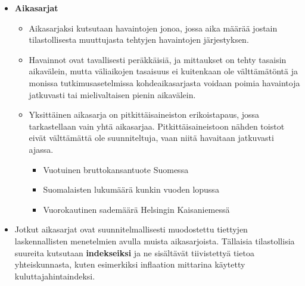 \documentclass[
]{book}
\providecommand{\tightlist}{%
  \setlength{\itemsep}{0pt}\setlength{\parskip}{0pt}}
\begin{document}
\begin{itemize}
\tightlist
\item
  \textbf{Aikasarjat}

  \begin{itemize}
  \tightlist
  \item
    Aikasarjaksi kutsutaan havaintojen jonoa, jossa aika
    määrää jostain tilastollisesta muuttujasta tehtyjen havaintojen järjestyksen.
  \item
    Havainnot ovat tavallisesti peräkkäisiä, ja mittaukset on tehty tasaisin aikavälein, mutta väliaikojen tasaisuus ei kuitenkaan ole välttämätöntä ja monissa tutkimusasetelmissa kohdeaikasarjasta voidaan poimia havaintoja jatkuvasti tai mielivaltaisen pienin aikavälein.
  \item
    Yksittäinen aikasarja on pitkittäisaineiston erikoistapaus, jossa tarkastellaan vain yhtä aikasarjaa. Pitkittäisaineistoon nähden toistot eivät välttämättä ole suunniteltuja, vaan niitä havaitaan jatkuvasti ajassa.

    \begin{itemize}
    \tightlist
    \item
      Vuotuinen bruttokansantuote Suomessa
    \item
      Suomalaisten lukumäärä kunkin vuoden lopussa
    \item
      Vuorokautinen sademäärä Helsingin Kaisaniemessä
    \end{itemize}
  \end{itemize}
\item
  Jotkut aikasarjat ovat suunnitelmallisesti muodostettu tiettyjen laskennallisten menetelmien avulla muista aikasarjoista. Tällaisia tilastollisia suureita kutsutaan \textbf{indekseiksi} ja ne sisältävät tiivistettyä tietoa yhteiskunnasta, kuten esimerkiksi inflaation mittarina käytetty kuluttajahintaindeksi.
\end{itemize}
\end{document}
